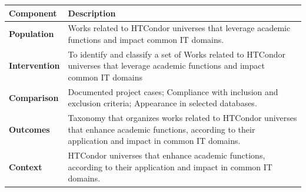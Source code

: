 \begin{table}
	{\begin{tabular}{p{2.0cm}p{8.0cm}} \toprule
			\textbf{Component}    & \textbf{Description}                                                                                                                                         \\
			\midrule
			\textbf{Population}   & Works related to HTCondor universes that leverage academic functions and impact common IT domains.                                                           \\
			\textbf{Intervention} & To identify and classify a set of Works related to HTCondor universes that leverage academic functions and impact common IT domains                          \\
			\textbf{Comparison}   & Documented project cases; Compliance with inclusion and exclusion criteria; Appearance in selected databases.                                                \\
			\textbf{Outcomes}     & Taxonomy that organizes works related to HTCondor universes that enhance academic functions, according to their application and impact in common IT domains. \\
			\textbf{Context}      & HTCondor universes that enhance academic functions, according to their application and impact in common IT domains.                                          \\
			\bottomrule
		\end{tabular}}
	\label{table:PICOC}
\end{table}

